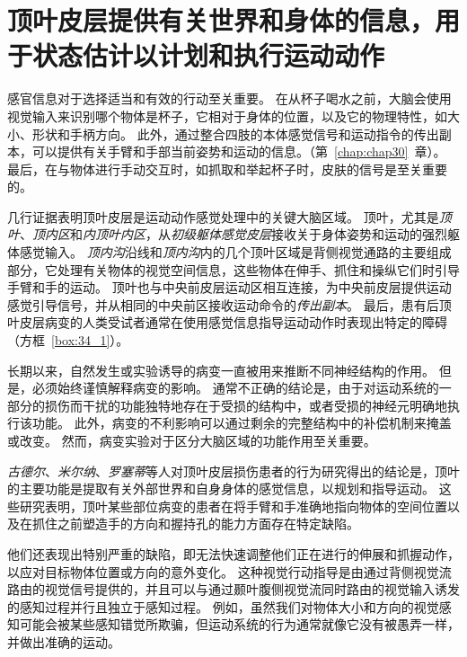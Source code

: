 \section{顶叶皮层提供有关世界和身体的信息，用于状态估计以计划和执行运动动作}

感官信息对于选择适当和有效的行动至关重要。
在从杯子喝水之前，大脑会使用视觉输入来识别哪个物体是杯子，它相对于身体的位置，以及它的物理特性，如大小、形状和手柄方向。
此外，通过整合四肢的本体感觉信号和运动指令的传出副本，可以提供有关手臂和手部当前姿势和运动的信息。（第~\ref{chap:chap30}~章）。
最后，在与物体进行手动交互时，如抓取和举起杯子时，皮肤的信号是至关重要的。


几行证据表明顶叶皮层是运动动作感觉处理中的关键大脑区域。
顶叶，尤其是\textit{顶叶}、\textit{顶内区}和\textit{内顶叶内区}，从\textit{初级躯体感觉皮层}接收关于身体姿势和运动的强烈躯体感觉输入。
\textit{顶内沟}沿线和\textit{顶内沟}内的几个顶叶区域是背侧视觉通路的主要组成部分，它处理有关物体的视觉空间信息，这些物体在伸手、抓住和操纵它们时引导手臂和手的运动。
顶叶也与中央前皮层运动区相互连接，为中央前皮层提供运动感觉引导信号，并从相同的中央前区接收运动命令的\textit{传出副本}。
最后，患有后顶叶皮层病变的人类受试者通常在使用感觉信息指导运动动作时表现出特定的障碍（方框~\ref{box:34_1}）。



\begin{proposition}[后顶叶皮层的病变研究导致使用感觉信息指导行动的缺陷] \label{box:34_1}
	
	\quad \quad 长期以来，自然发生或实验诱导的病变一直被用来推断不同神经结构的作用。
	但是，必须始终谨慎解释病变的影响。
	通常不正确的结论是，由于对运动系统的一部分的损伤而干扰的功能独特地存在于受损的结构中，或者受损的神经元明确地执行该功能。
	此外，病变的不利影响可以通过剩余的完整结构中的补偿机制来掩盖或改变。
	然而，病变实验对于区分大脑区域的功能作用至关重要。
	
	\quad \textit{古德尔}、\textit{米尔纳}、\textit{罗塞蒂}等人对顶叶皮层损伤患者的行为研究得出的结论是，顶叶的主要功能是提取有关外部世界和自身身体的感觉信息，以规划和指导运动。
	这些研究表明，顶叶某些部位病变的患者在将手臂和手准确地指向物体的空间位置以及在抓住之前塑造手的方向和握持孔的能力方面存在特定缺陷。
	
	\quad \quad 他们还表现出特别严重的缺陷，即无法快速调整他们正在进行的伸展和抓握动作，以应对目标物体位置或方向的意外变化。
	这种视觉行动指导是由通过背侧视觉流路由的视觉信号提供的，并且可以与通过颞叶腹侧视觉流同时路由的视觉输入诱发的感知过程并行且独立于感知过程。
	例如，虽然我们对物体大小和方向的视觉感知可能会被某些感知错觉所欺骗，但运动系统的行为通常就像它没有被愚弄一样，并做出准确的运动。
	
\end{proposition}



